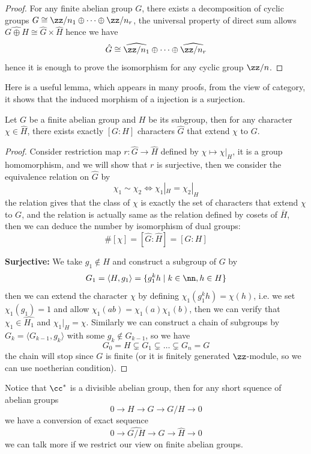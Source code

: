 \begin{proof}
    For any finite abelian group \(G\), there exists a decomposition of cyclic groups \(G \cong \zz/n_1 \oplus \cdots \oplus \zz/n_r\), the universal property of direct sum allows \(\widehat{G \oplus H} \cong \widehat{G} \times \widehat{H}\) hence we have
    \[\hat{G} \cong \widehat{\zz/n_1}\oplus \cdots \oplus \widehat{\zz/n_{r}}\]
    hence it is enough to prove the isomorphism for any cyclic group \(\zz/n\).
\end{proof}

Here is a useful lemma, which appears in many proofs, from the view of category, it shows that the induced morphism of a injection is a surjection.
\begin{lemma}
    Let \(G\) be a finite abelian group and \(H\) be its subgroup, then for any character \(\chi \in \hat{H}\), there exists exactly \([G:H]\) characters \(\hat{G}\) that extend \(\chi\) to \(G\).
\end{lemma}
\begin{proof}
    Consider restriction map \(r: \hat{G} \to \hat{H}\) defined by \(\chi \mapsto \chi|_H\), it is a group homomorphism, and we will show that \(r\) is surjective, then we consider the equivalence relation on \(\hat{G}\) by
    \[\chi_1 \sim \chi_2 \iff \chi_1|_H = \chi_2|_H\]
    the relation gives that the class of \(\chi\) is exactly the set of characters that extend \(\chi\) to \(G\), and the relation is actually same as the relation defined by cosets of \(\bar{H}\), then we can deduce the number by isomorphism of dual groups:
    \[\#[\chi] = [\hat{G}:\hat{H}] = [G:H]\]

    \textbf{Surjective:} We take \(g_1 \notin H\) and construct a subgroup of \(G\) by
    \[G_1 = \langle H,g_1 \rangle = \{g_1^kh \mid k\in \nn, h \in H\}\]
    then we can extend the character \(\chi\) by defining \(\chi_1(g_1^kh) = \chi(h)\), i.e. we set \(\chi_1(g_1) = 1\) and allow \(\chi_1(ab) = \chi_1(a)\chi_1(b)\), then we can verify that \(\chi_1 \in \widehat{H_1}\) and \(\chi_1|_H = \chi\). Similarly we can construct a chain of subgroups by \(G_k = \langle G_{k-1},g_k \rangle\) with some \(g_k \notin G_{k-1}\), so we have
    \[G_0 = H \subsetneq G_1 \subsetneq \dots \subsetneq G_n = G\]
    the chain will stop since \(G\) is finite (or it is finitely generated \(\zz\)-module, so we can use noetherian condition).
\end{proof}
\begin{remark}
    Notice that \(\cc^*\) is a divisible abelian group, then for any short squence of abelian groups
    \[0 \to H \to G \to G/H \to 0\]
    we have a conversion of exact sequence
    \[0 \to \widehat{G/H} \to \hat{G} \to \hat{H} \to 0\]
    we can talk more if we restrict our view on finite abelian groups.
\end{remark}

